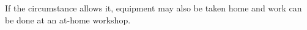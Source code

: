 \documentclass[11pt, a4paper, twoside, openright]{report}
\begin{document}
If the circumstance allows it, equipment may also be taken home and work can be done at an at-home workshop. 



\backmatter

% 
% 
\end{document}
